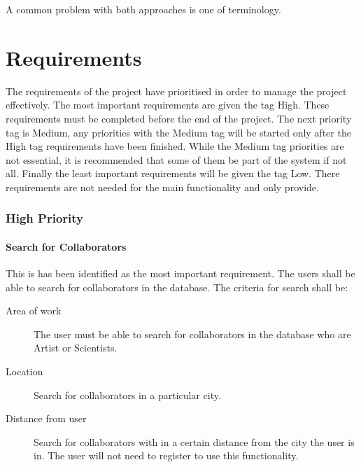 \documentclass[a4paper,oneside,11pt]{report}
\begin{document}
A common problem with both approaches is one of terminology.



\chapter{Requirements}
The requirements of the project have prioritised in order to manage the project effectively. The most important requirements are given the tag High. These requirements must be completed before the end of the project. The next priority tag is Medium, any priorities with the Medium tag will be started only after the High tag requirements have been finished. While the Medium tag priorities are not essential, it is recommended that some of them be part of the system if not all. Finally the least important requirements will be given the tag Low. There requirements are not needed for the main functionality and only provide.

\subsection{High Priority}
\subsubsection{Search for Collaborators} 
This is has been identified as the most important requirement. The users shall be able to search for collaborators in the database. The criteria for search shall be:
\begin{description}
	\item[Area of work] The user must be able to search for collaborators in the database who are Artist or Scientists.
	\item[Location] Search for collaborators in a particular city.
	\item[Distance from user] Search for collaborators with in a certain distance from the city the user is in. The user will not need to register to use this functionality.
\end{description}
	
\end{document}
